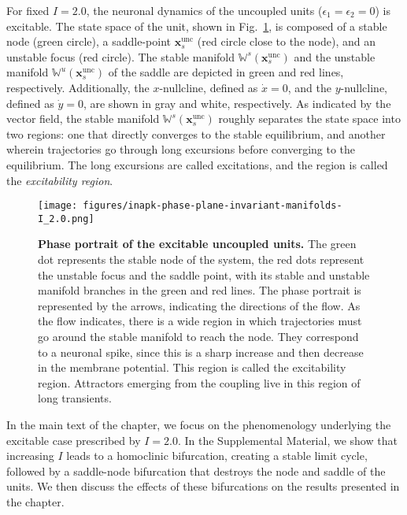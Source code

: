 For fixed $I = 2.0$, the neuronal dynamics of the uncoupled units ($\epsilon_1 = \epsilon_2 = 0$) is excitable. The state space of the unit, shown in Fig.~\ref{fig:excitable-neuron}, is composed of a stable node (green circle), a saddle-point $\mathbf{x}_s^\mathrm{unc}$ (red circle close to the node), and an unstable focus (red circle). The stable manifold $\mathbb{W}^s(\mathbf{x}_s^\mathrm{unc})$ and the unstable manifold $\mathbb{W}^u(\mathbf{x}_s^\mathrm{unc})$ of the saddle are depicted in green and red lines, respectively. Additionally, the $x$-nullcline, defined as $\dot{x} = 0$, and the $y$-nullcline, defined as $\dot{y} = 0$, are shown in gray and white, respectively. 
As indicated by the vector field, the stable manifold $\mathbb{W}^s(\mathbf{x}_s^\mathrm{unc})$ roughly separates the state space into two regions: one that directly converges to the stable equilibrium, and another wherein trajectories go through long excursions before converging to the equilibrium. The long excursions are called excitations, and the region is called the \textit{excitability region}. 
%
\begin{figure}
    \centering
    \texttt{[image: figures/inapk-phase-plane-invariant-manifolds-I\_2.0.png]}
    \caption{\textbf{Phase portrait of the excitable uncoupled units.} The green dot represents the stable node of the system, the red dots represent the unstable focus and the saddle point, with its stable and unstable manifold branches in the green and red lines. The phase portrait is represented by the arrows, indicating the directions of the flow. As the flow indicates, there is a wide region in which trajectories must go around the stable manifold to reach the node. They correspond to a neuronal spike, since this is a sharp increase and then decrease in the membrane potential. This region is called the excitability region. Attractors emerging from the coupling live in this region of long transients. }
    \label{fig:excitable-neuron}
\end{figure}

In the main text of the chapter, we focus on the phenomenology underlying the excitable case prescribed by $I=2.0$. In the Supplemental Material, we show that increasing $I$ leads to a homoclinic bifurcation, creating a stable limit cycle, followed by a saddle-node bifurcation that destroys the node and saddle of the units. We then discuss the effects of these bifurcations on the results presented in the chapter.

